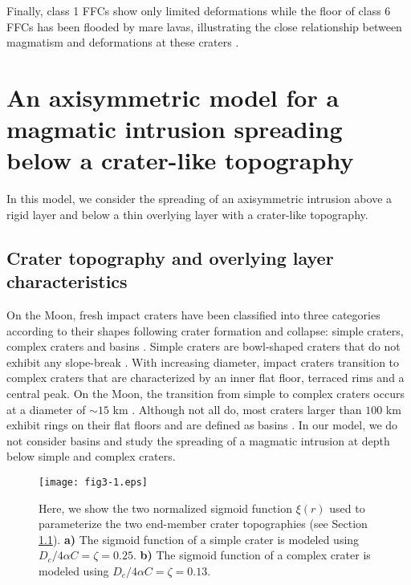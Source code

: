 	
Finally, class 1  FFCs show only limited deformations  while the floor
of class 6 FFCs has been flooded by mare lavas, illustrating the close
relationship  between  magmatism  and deformations  at  these  craters
\citep{Schultz:1976kt,Jozwiak:2012dq}.

\section[A model for crater-centered intrusion]{An axisymmetric model for a magmatic intrusion spreading
  below a crater-like topography}

In this model, we consider  the spreading of an axisymmetric intrusion
above  a  rigid  layer  and  below  a  thin  overlying  layer  with  a
crater-like topography.
	
\subsection{Crater topography and overlying layer characteristics}
\label{C5-Crater_Topography}
	
On  the Moon,  fresh impact  craters have  been classified  into three
categories according  to their  shapes following crater  formation and
collapse:    simple    craters,    complex    craters    and    basins
\citep{Pike:1974ux,Schultz:1976vl,Pike:1980eh,Baker:2011kh}.    Simple
craters are  bowl-shaped craters that  do not exhibit  any slope-break
\citep{Pike:1980eh}.    With  increasing   diameter,  impact   craters
transition to complex craters that  are characterized by an inner flat
floor, terraced rims  and a central peak. On the  Moon, the transition
from simple  to complex craters occurs  at a diameter of  $\sim 15$ km
\citep{Pike:1980eh,Hiesinger:2006cb,OKeefe:1999uj,Kalynn:2013fg}.
Although not all  do, most craters larger than $100$  km exhibit rings
on    their    flat    floors    and    are    defined    as    basins
\citep{Wilhelms:1987vb,Schultz:1988wb}.   In  our  model,  we  do  not
consider basins  and study  the spreading of  a magmatic  intrusion at
depth below simple and complex craters.

\begin{figure}[h!]
  \graphicspath{ {/Users/thorey/Documents/These/Submission/Article/FFC_JGR_2013/Paper_APRES_2nd_REVIEW/} }
  \centering
  \noindent\texttt{[image: fig3-1.eps]}
  \caption{ Here, we show the two normalized sigmoid function $\xi(r)$
    used to  parameterize the two end-member  crater topographies (see
    Section  \ref{C5-Crater_Topography}).    \textbf{a)}  The  sigmoid
    function    of    a    simple     crater    is    modeled    using
    $D_c/4\alpha C=\zeta=0.25$.  \textbf{b)} The sigmoid function of a
    complex crater is modeled using $D_c/4\alpha C=\zeta=0.13$. }
  \label{C5-fig3-1}
\end{figure}
	
